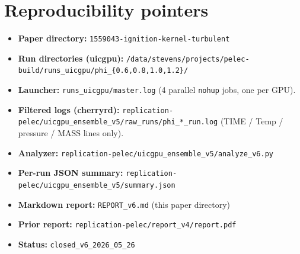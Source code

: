 \documentclass[11pt]{article}
\begin{document}
\section{Reproducibility pointers}
\begin{itemize}
\item \textbf{Paper directory:} \texttt{1559043-ignition-kernel-turbulent}
\item \textbf{Run directories (uicgpu):}
  \texttt{/data/stevens/projects/pelec-build/runs\_uicgpu/phi\_\{0.6,0.8,1.0,1.2\}/}
\item \textbf{Launcher:} \texttt{runs\_uicgpu/master.log} (4 parallel
  \texttt{nohup} jobs, one per GPU).
\item \textbf{Filtered logs (cherryrd):}
  \texttt{replication-pelec/uicgpu\_ensemble\_v5/raw\_runs/phi\_*\_run.log}
  (TIME / Temp / pressure / MASS lines only).
\item \textbf{Analyzer:}
  \texttt{replication-pelec/uicgpu\_ensemble\_v5/analyze\_v6.py}
\item \textbf{Per-run JSON summary:}
  \texttt{replication-pelec/uicgpu\_ensemble\_v5/summary.json}
\item \textbf{Markdown report:} \texttt{REPORT\_v6.md} (this paper directory)
\item \textbf{Prior report:} \texttt{replication-pelec/report\_v4/report.pdf}
\item \textbf{Status:} \texttt{closed\_v6\_2026\_05\_26}
\end{itemize}
\end{document}
